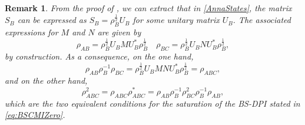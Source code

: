 \documentclass[11pt]{article}
\theoremstyle{newdefinition}
\theoremstyle{newplain}
\newtheorem{remark}[definition]{Remark}
\theoremstyle{myplain}
\DeclareMathOperator{\1}{\mathds{1}}
\begin{document}
\begin{comment}
Moreover, since $\tr_C[R]=I_{AB}$, we must have
$\Tr_C[N]=I_B$. 
 Note also that 
\[
 M\otimes I_C\in (I_A\otimes \mathcal{B})'\otimes I_C=(I_A\otimes \mathcal{B}\otimes
 B(\mathcal{H}_C))',
\]
so that $M\otimes I_C$ commutes with $I_A\otimes N$. To finish the proof, we write
\[
\rho_{ABC}=(\rho^{1/2}_{AB}\otimes I_C)R(\rho^{1/2}_{AB}\otimes I_C)
\]
and 
\[
\rho_{AB}^{1/2}=(I_A\otimes \rho_B^{1/2})V=(I_A\otimes \rho_B^{1/2})M^{1/2}W.
\]
Combining this with \eqref{eq:R}, we obtain
\[
\rho_{ABC}=(I_A\otimes \rho_B^{1/2}\otimes I_C)(M\otimes I_C)(I_A\otimes N)(I_A\otimes
\rho_B^{1/2}\otimes I_C).
\]
Since $\mathcal {B}\subseteq B(\mathcal{H}_B)$ is a subalgebra, there are Hilbert spaces as in (i) and a
unitary $U_B:\mathcal {H}_B\to \oplus_n \mathcal {H}_{B^L_n}\otimes \mathcal{H}_{B^R_n}$ such that
\[
\mathcal{B}=U^*_B\left(\bigoplus_n I_{B^L_n}\otimes B(\mathcal{H}_{B^R_n})\right) U_B.
\]
Using this decomposition, we see that there are elements $M_n$ as in (ii) such that 
$M=(I_A\otimes U^*_B)(\oplus_n M_n\otimes I_{B^R_n})(I_A\otimes U_B)$ and similarly, there
are elements $N_n$ as in (iii) such that $N=(U_B^*\otimes I_C)(\oplus_n I_{B^L_n}\otimes
N_n)(U_B\otimes I_C)$. Now we see that $\rho_{ABC}$ has the required form, with
$S_B=\rho^{1/2}_BU^*_B$.


\end{proof}

\end{comment}








\begin{remark} \label{rem:from-decomposition-to-map}
From the proof of 
, we can extract that in \eqref{AnnaStates}, the matrix $S_B$ can be expressed as $S_B=\rho_B^{\frac{1}{2}}U_B$ for some unitary matrix $U_B$. The associated expressions for $M$ and $N$ are given by
\begin{equation}
   \rho_{AB}=\rho_B^{\frac{1}{2}}U_BMU_B^*\rho_B^{\frac{1}{2}} \quad \rho_{BC}=\rho_B^{\frac{1}{2}}U_BNU_B^*\rho_B^{\frac{1}{2}},
\end{equation}
by construction. As a consequence, on the one hand,
\begin{equation}
    \rho_{AB}\rho_{B}^{-1}\rho_{BC}=\rho_B^{\frac{1}{2}}U_BM N U_B^*\rho_B^{\frac{1}{2}}=\rho_{ABC},
\end{equation}
and on the other hand,
\begin{equation}
\rho_{ABC}^2=\rho_{ABC}\rho_{ABC}^*=\rho_{AB}\rho_{B}^{-1}\rho_{BC}^2\rho_B^{-1}\rho_{AB},
\end{equation}
which are the two equivalent conditions for the saturation of the BS-DPI stated in \eqref{eq:BSCMIZero}.
\end{remark}
\end{document}
